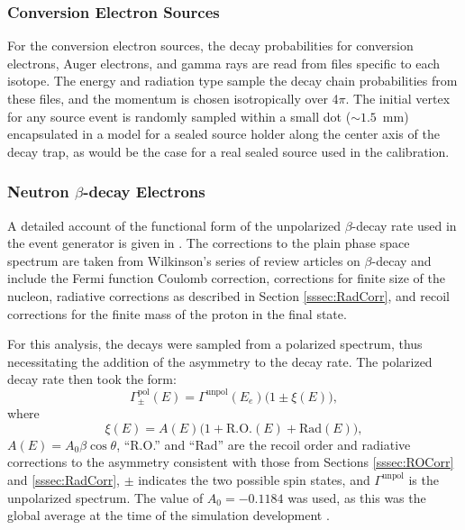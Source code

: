 \subsubsection{Conversion Electron Sources}
For the conversion electron sources, the decay probabilities for conversion electrons,
Auger electrons, and gamma rays are read from files specific to each isotope.
The energy and radiation type sample the decay chain probabilities from these files, and
the momentum is chosen isotropically over 4$\pi$. The initial vertex for any source
event is randomly sampled within a small dot ($\sim1.5$~mm) encapsulated in a model for a sealed source holder
along the center axis of the decay trap, as would be the case for a real sealed
source used in the calibration.

\subsubsection{Neutron $\beta$-decay Electrons} \label{sssec:betaSim}

A detailed account of the functional form of the unpolarized $\beta$-decay rate used in the
event generator
is given in \cite{mpmThesis}. The corrections to the plain phase space spectrum are taken from
Wilkinson's series of review articles on $\beta$-decay
\cite{wilkinson1982,wilkinson1989evaluation,wilkinson1990evaluation,wilkinson1993evaluation,
  wilkinson1995evaluation,wilkinson1997evaluation,wilkinson1998evaluation} and include
the Fermi function Coulomb correction, corrections for finite size of the nucleon, radiative
corrections as described in Section \ref{sssec:RadCorr}, and recoil corrections for the finite
mass of the proton in the final state.

For this analysis, the decays were sampled from a polarized spectrum, thus necessitating the
addition of the asymmetry to the decay rate. The polarized decay rate then took the form:
\begin{equation}
  \Gamma^{\mathrm{pol}}_\pm(E) = \Gamma^{\mathrm{unpol}}(E_e) \bigg( 1 \pm \xi(E) \bigg),
\end{equation}
where
\begin{equation}
  \xi(E) = A(E)\Big(1+\mathrm{R.O.}(E)+\mathrm{Rad}(E)\Big),
\end{equation}
$A(E)=A_0\beta \cos\theta$, ``R.O.'' and ``Rad'' are the recoil order and radiative corrections to the asymmetry
consistent with those from Sections \ref{sssec:ROCorr} and \ref{sssec:RadCorr}, $\pm$ indicates the two possible spin states,
and $\Gamma^{\mathrm{unpol}}$ is the unpolarized
spectrum. The value of $A_0= -0.1184$ was used, as this was the global average at the time of the simulation
development \cite{pdg}.


